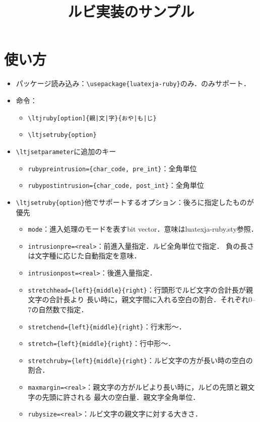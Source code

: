 \documentclass[b5paper,10pt]{ltjsarticle}
\title{ルビ実装のサンプル}
\begin{document}
\maketitle

\section{使い方}
\begin{itemize}
\item パッケージ読み込み：\verb+\usepackage{luatexja-ruby}+のみ．\LaTeXe のみサポート．
\item 命令：
\begin{itemize}
\item \verb+\ltjruby[option]{親|文|字}{おや|も|じ}+
\item \verb|\ltjsetruby{option}|
\end{itemize}
\item \verb|\ltjsetparameter|に追加のキー
\begin{itemize}
\item \verb+rubypreintrusion={char_code, pre_int}+：全角単位
\item \verb+rubypostintrusion={char_code, post_int}+：全角単位
\end{itemize}
\item \verb|\ltjsetruby{option}|他でサポートするオプション：後ろに指定したものが優先
\begin{itemize}
\item \verb+mode+：進入処理のモードを表すbit vector．意味はluatexja-ruby.sty参照．
\item \verb+intrusionpre=<real>+：前進入量指定．ルビ全角単位で指定．
負の長さは文字種に応じた自動指定を意味．
\item \verb+intrusionpost=<real>+：後進入量指定．
\item \verb+stretchhead={left}{middle}{right}+：行頭形でルビ文字の合計長が親文字の合計長より
長い時に，親文字間に入れる空白の割合．それぞれ0--7の自然数で指定．
\item \verb+stretchend={left}{middle}{right}+：行末形〜．
\item \verb+stretch={left}{middle}{right}+：行中形〜．
\item \verb+stretchruby={left}{middle}{right}+：ルビ文字の方が長い時の空白の割合．
\item \verb+maxmargin=<real>+：親文字の方がルビより長い時に，ルビの先頭と親文字の先頭に許される
最大の空白量．親文字全角単位．
\item \verb+rubysize=<real>+：ルビ文字の親文字に対する大きさ．
\end{itemize}
\end{itemize}
\end{document}
